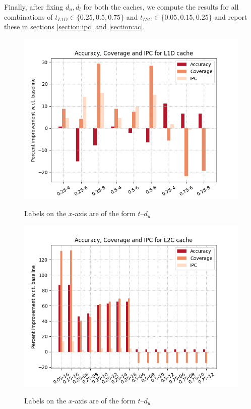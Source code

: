 \documentclass[11pt, swedish, openany]{book}
\begin{document}
\medskip
Finally, after fixing $d_u, d_l$ for both the caches, we compute the results for all combinations of $t_{L1D} \in \{0.25, 0.5, 0.75\}$ and $t_{L2C} \in \{0.05, 0.15, 0.25\}$ and report these in sections \ref{section:ipc} and \ref{section:ac}.

\begin{figure}[H]
    \centering
    {\includegraphics[scale = 0.65]{images/L1D.png}}
    \caption{Labels on the $x$-axis are of the form $t$--$d_u$}
    \label{fig:l1d}
\end{figure}

\begin{figure}[H]
    \centering
    {\includegraphics[scale = 0.65]{images/L2C.png}}
    \caption{Labels on the $x$-axis are of the form $t$--$d_u$}
    \label{fig:l2c}
\end{figure}
\end{document}
